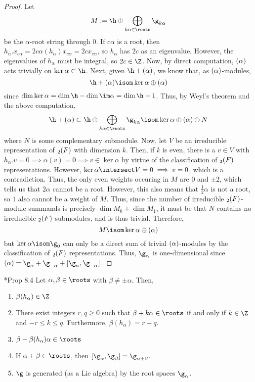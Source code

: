 \documentclass[11pt,leqno,oneside]{amsart}
\numberwithin{thm}{section}
\begin{document}
\begin{proof}
  Let \[
    M := \h \oplus \bigoplus_{k \alpha \in \roots} \g_{k \alpha}
  \]
  be the \(\alpha\)-root string through \(0\). 
  If \(c \alpha\) is a root, then \(h_\alpha.x_{c\alpha} =
  2c\alpha(h_\alpha)x_{c \alpha} = 2c x_{c \alpha}\), so \(h_\alpha\)
  has \(2c\) as an eigenvalue. However, the eigenvalues of
  \(h_\alpha\) must be integral, so \(2c \in \Z\). Now, by direct
  computation, 
  \(\sl(\alpha)\) acts trivially on \(\ker \alpha \subset \h\). Next,
  given \(\h + \sl(\alpha)\), we know that, as \(\sl(\alpha)\)-modules, \[
    \h + \sl(\alpha) \isom \ker \alpha \oplus \sl(\alpha)
  \]
  since \(\dim \ker \alpha = \dim \h - \dim \im \alpha = \dim \h -
  1\). Thus, by Weyl's theorem and the above computation, \[
    \h + \sl(\alpha) \subset \h \oplus \bigoplus_{k \alpha \in \roots}
    \g_{k \alpha} \isom \ker \alpha \oplus \sl(\alpha) \oplus N
  \]
  where \(N\) is some complementary submodule. Now, let \(V\) be an
  irreducible representation of \(\sl_2(F)\) with dimension
  \(k\). Then, if \(k\) is even, there is a \(v \in V\) with
  \(h_\alpha .v = 0
  \implies \alpha(v) = 0 \implies v \in \ker \alpha\) by virtue of the
  classification of 
  \(\sl_2(F)\) representations. However, \(\ker \alpha \intersect V =
  0 \implies v = 0\), which is a contradiction. Thus, the only even
  weights occuring in \(M\) are \(0\) and \(\pm 2\), which tells us
  that \(2 \alpha\) cannot be a root. However, this also means that
  \(\frac{1}{2} \alpha\) is not a root, so \(1\) also cannot be a
  weight of \(M\). Thus, since the number of irreducible
  \(\sl_2(F)\)-module summands is precisely \(\dim M_0 + \dim M_1\),
  it must be that \(N\) contains no irreducible
  \(\sl_2(F)\)-submodules, and is thus trivial. Therefore, \[
    M \isom \ker \alpha \oplus \sl(\alpha)
  \]
  but \(\ker \alpha \isom \g_0\) can only be a direct sum of trivial
  \(\sl(\alpha)\)-modules by the classification of \(\sl_2(F)\)
  representations. Thus, \(\g_\alpha\) is one-dimensional since 
  \(\sl(\alpha) = \g_\alpha + \g_{-\alpha} + [\g_\alpha, \g_{-\alpha}]\).
\end{proof}
\begin{prop}\label{integrality-props}
  \cite{humph}*{Prop 8.4} Let \(\alpha, \beta \in \roots\) with
  \(\beta \neq \pm 
  \alpha\). Then,
  \begin{enumerate}
  \item \(\beta(h_\alpha) \in \Z\)
  \item There exist integers \(r,q \geq 0\) such that \(\beta + k
    \alpha \in \roots\) if and only if \(k \in \Z\) and \(-r \leq k
    \leq q\). Furthermore, \(\beta(h_\alpha) = r-q\).
  \item \(\beta - \beta(h_\alpha)\alpha \in \roots\)
  \item If \(\alpha+\beta \in \roots\), then \([\g_\alpha,\g_\beta] =
    \g_{\alpha+\beta}\).
   \item \(\g\) is generated (as a Lie algebra) by the root spaces
     \(\g_\alpha\).
  \end{enumerate}
\end{prop}
\end{document}
